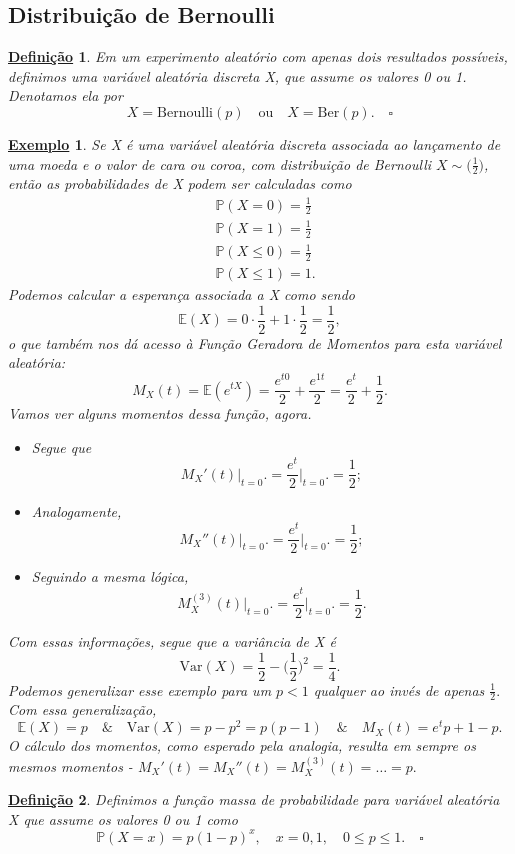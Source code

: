 \documentclass{article}
\newtheorem*{def*}{\underline{Defini\c c\~ao}}
\newtheorem{example}{\underline{Exemplo}}
\begin{document}
\subsection{Distribuição de Bernoulli}
\begin{def*}
  Em um experimento aleatório com apenas dois resultados possíveis, definimos uma variável aleatória discreta X, que assume os valores 0 ou 1. Denotamos ela por 
  \[
    X = \mathrm{Bernoulli}(p)\quad\text{ou}\quad X = \mathrm{Ber}(p). \quad\square
  \]
\end{def*}
\begin{example}
  Se X é uma variável aleatória discreta associada ao lançamento de uma moeda e o valor de cara ou coroa, com distribuição de Bernoulli \(X\sim \biggl(\frac{1}{2}\biggr)\), então as probabilidades de X podem ser calculadas como
  \begin{align*}
   &\mathbb{P}(X=0) = \frac{1}{2}\\
   &\mathbb{P}(X=1) = \frac{1}{2}\\
   &\mathbb{P}(X\leq 0) = \frac{1}{2}\\
   &\mathbb{P}(X\leq 1) = 1.
  \end{align*}
  Podemos calcular a esperança associada a X como sendo 
  \[
    \mathbb{E}(X) = 0 \cdot \frac{1}{2} + 1 \cdot \frac{1}{2} = \frac{1}{2},
  \]
  o que também nos dá acesso à Função Geradora de Momentos para esta variável aleatória:
  \[
    M_{X}(t) = \mathbb{E}(e^{tX}) = \frac{e^{t0}}{2} + \frac{e^{1t}}{2} = \frac{e^{t}}{2} + \frac{1}{2}.
  \]
  Vamos ver alguns momentos dessa função, agora.
  \begin{itemize}
    \item[\({1}^{\mathrm{o}}\)):] Segue que 
      \[
        M_{X}'(t)\biggl|_{t=0}^{}\biggr. = \frac{e^{t}}{2}\biggl|_{t=0}^{}\biggr. = \frac{1}{2};
      \]
    \item[\({2}^{\mathrm{o}}\)):] Analogamente, 
      \[
        M_{X}''(t)\biggl|_{t=0}^{}\biggr. = \frac{e^{t}}{2}\biggl|_{t=0}^{}\biggr. = \frac{1}{2};
      \]
    \item[\({3}^{\mathrm{o}}\)):] Seguindo a mesma lógica,
      \[
        M_{X}^{(3)}(t)\biggl|_{t=0}^{}\biggr. = \frac{e^{t}}{2}\biggl|_{t=0}^{}\biggr. = \frac{1}{2}.
      \]
  \end{itemize}
  Com essas informações, segue que a variância de X é 
    \[
      \mathrm{Var}(X) = \frac{1}{2} - \biggl(\frac{1}{2}\biggr)^{2} = \frac{1}{4}.
    \]
  Podemos generalizar esse exemplo para um \(p < 1\) qualquer ao invés de apenas \(\frac{1}{2}.\) Com essa generalização, 
    \[
      \mathbb{E}(X) = p\quad\&\quad \mathrm{Var}(X) = p - p^{2} = p(p-1)\quad\&\quad M_{X}(t) = e^{t}p + 1 - p.
    \]
  O cálculo dos momentos, como esperado pela analogia, resulta em sempre os mesmos momentos - \(M_{X}'(t) = M_{X}''(t) = M_{X}^{(3)}(t)=\dotsc = p.\)
\end{example}
 \begin{def*}
   Definimos a função massa de probabilidade para variável aleatória X que assume os valores 0 ou 1 como
     \[
       \mathbb{P}(X=x) = p(1-p)^{x},\quad x=0, 1, \quad 0\leq p\leq 1.\quad \square
     \]
 \end{def*}
\end{document}
